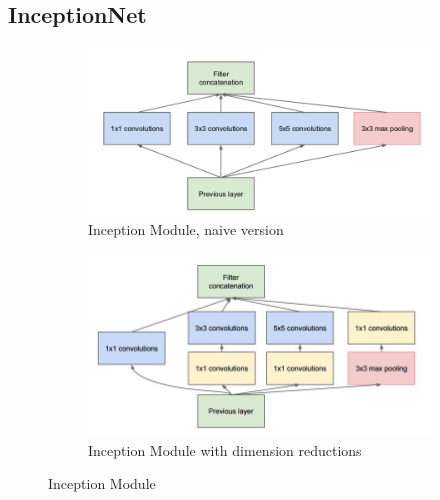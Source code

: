 \subsection{InceptionNet}
\begin{figure}[b]
    \centering
    \begin{subfigure}[b]{0.48\linewidth}        %
        \centering
        \includegraphics[width=\linewidth]{images/incNet/incnaivemodule.png}
        \caption{Inception Module, naive version}
        \label{fig:incNaiveMod}
    \end{subfigure}
    \begin{subfigure}[b]{0.48\linewidth}        %
        \centering
        \includegraphics[width=\linewidth]{images/incNet/incmodule.jpeg}
        
        \caption{Inception Module with dimension reductions}
        \label{fig:incModule}
    \end{subfigure}
    \caption{Inception Module}

    \label{fig:NEV_images}
\end{figure}

